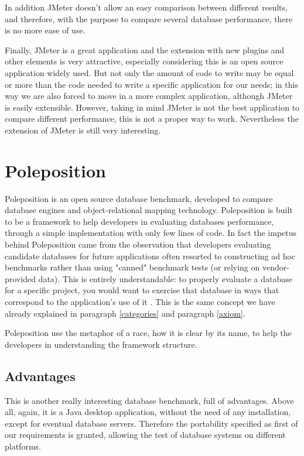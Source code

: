 In addition JMeter doesn't allow an easy comparison between different results, and therefore, with the purpose to compare several database performance, there is no more ease of use.

Finally, JMeter is a great application and the extension with new plugins and other elements is very attractive, especially considering this is an open source application widely used. But not only the amount of code to write may be equal or more than the code needed to write a specific application for our needs; in this way we are also forced to move in a more complex application, although JMeter is easily extensible. However, taking in mind JMeter is not the best application to compare different performance, this is not a proper way to work. Nevertheless the extension of JMeter is still very interesting.
	
	\section{Poleposition} \label{poleposition}
Poleposition is an open source database benchmark, developed to compare database engines and object-relational mapping technology. Poleposition is built to be a framework to help developers in evaluating databases performance, through a simple implementation with only few lines of code. In fact the impetus behind Poleposition came from the observation that developers evaluating candidate databases for future applications often resorted to constructing ad hoc benchmarks rather than using "canned" benchmark tests (or relying on vendor-provided data). This is entirely understandable: to properly evaluate a database for a specific project, you would want to exercise that database in ways that correspond to the application's use of it \cite{poleposition}. This is the same concept we have already explained in paragraph \ref{categories} and paragraph \ref{axiom}.

Poleposition use the metaphor of a race, how it is clear by its name, to help the developers in understanding the framework structure.

		\subsection{Advantages}
This is another really interesting database benchmark, full of advantages. Above all, again, it is a Java desktop application, without the need of any installation, except for eventual database servers. Therefore the portability specified as first of our requirements is granted, allowing the test of database systems on different platforms.

